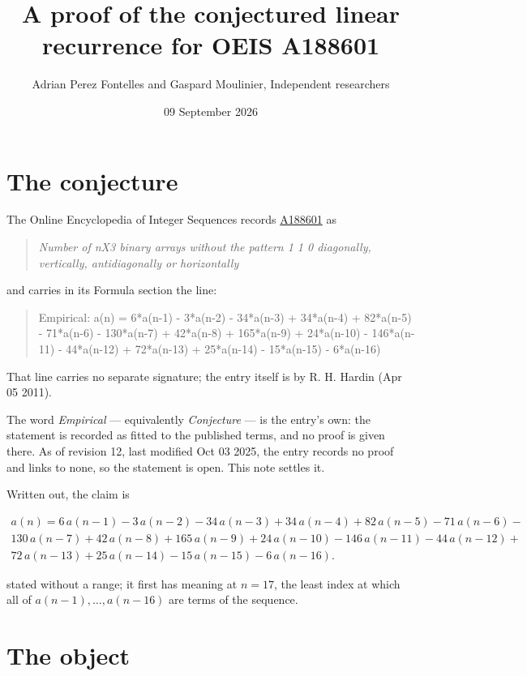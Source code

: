 \documentclass[11pt]{article}
\title{A proof of the conjectured linear recurrence for OEIS A188601}
\author{Adrian Perez Fontelles and Gaspard Moulinier, Independent researchers}
\date{09 September 2026}
\theoremstyle{definition}
\begin{document}
\maketitle
\section{The conjecture}

The Online Encyclopedia of Integer Sequences records \href{https://oeis.org/A188601}{A188601} as

\begin{quote}\itshape Number of nX3 binary arrays without the pattern 1 1 0 diagonally, vertically, antidiagonally or horizontally\end{quote}

and carries in its Formula section the line:

\begin{quote}\ttfamily Empirical: a(n) = 6*a(n-1) - 3*a(n-2) - 34*a(n-3) + 34*a(n-4) + 82*a(n-5) - 71*a(n-6) - 130*a(n-7) + 42*a(n-8) + 165*a(n-9) + 24*a(n-10) - 146*a(n-11) - 44*a(n-12) + 72*a(n-13) + 25*a(n-14) - 15*a(n-15) - 6*a(n-16)\end{quote}

That line carries no separate signature; the entry itself is by R. H. Hardin (Apr 05 2011).

The word {\itshape Empirical} --- equivalently {\itshape Conjecture} --- is the entry's own: the statement is recorded as fitted to the published terms, and no proof is given there. As of revision 12, last modified Oct 03 2025, the entry records no proof and links to none, so the statement is open. This note settles it.

Written out, the claim is

\begin{multline*} a(n) = 6\,a(n-1) - 3\,a(n-2) - 34\,a(n-3) + 34\,a(n-4) + 82\,a(n-5) - 71\,a(n-6) - \\ 130\,a(n-7) + 42\,a(n-8) + 165\,a(n-9) + 24\,a(n-10) - 146\,a(n-11) - 44\,a(n-12) + \\ 72\,a(n-13) + 25\,a(n-14) - 15\,a(n-15) - 6\,a(n-16). \end{multline*}

stated without a range; it first has meaning at $n = 17$, the least index at which all of $a(n-1),\dots,a(n-16)$ are terms of the sequence.

\section{The object}
\end{document}
